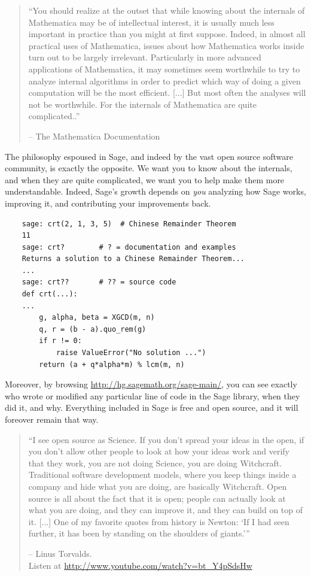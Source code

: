 \documentclass[multi]{cambridge7A}
\theoremstyle{plain}%
\theoremstyle{definition}
\begin{document}
\begin{quote}\small
  ``You should realize at the outset that while knowing about the
  internals of Mathematica may be of intellectual interest, it is
  usually much less important in practice than you might at first
  suppose.  Indeed, in almost all practical uses of Mathematica,
  issues about how Mathematica works inside turn out to be largely
  irrelevant.  Particularly in more advanced applications of
  Mathematica, it may sometimes seem worthwhile to try to analyze
  internal algorithms in order to predict which way of doing a given
  computation will be the most efficient. [...]  But most often the
  analyses will not be worthwhile. For the internals of Mathematica
  are quite complicated..''

-- The Mathematica Documentation
\end{quote}
The philosophy espoused in Sage, and indeed by the vast open source
software community, is exactly the opposite.  We want you to know
about the internals, and when they are quite complicated, we
want you to help make them more understandable.  Indeed, Sage's growth
depends on {\em you} analyzing how Sage works, improving it, and
contributing your improvements back.
\begin{lstlisting}
    sage: crt(2, 1, 3, 5)  # Chinese Remainder Theorem
    11 
    sage: crt?        # ? = documentation and examples
    Returns a solution to a Chinese Remainder Theorem...
    ...
    sage: crt??       # ?? = source code
    def crt(...):
    ...
        g, alpha, beta = XGCD(m, n)
        q, r = (b - a).quo_rem(g)
        if r != 0:
            raise ValueError("No solution ...")
        return (a + q*alpha*m) % lcm(m, n)
\end{lstlisting}
Moreover, by browsing \url{http://hg.sagemath.org/sage-main/}, you can
see exactly who wrote or modified any particular line of code in the
Sage library, when they did it, and why.  Everything included in Sage
is free and open source, and it will foreover remain
that way.

\begin{quote}\small
  ``I see open source as Science.  If you don't spread your ideas in
  the open, if you don't allow other people to look at how your ideas
  work and verify that they work, you are not doing Science, you are
  doing Witchcraft.  Traditional software development models, where
  you keep things inside a company and hide what you are doing, are
  basically Witchcraft.  Open source is all about the fact that it is
  open; people can actually look at what you are doing, and they can
  improve it, and they can build on top of it. [...] One of my
  favorite quotes from history is Newton: `If I had seen further, it
  has been by standing on the shoulders of giants.'{}''

  -- Linus Torvalds.\\\vbox{}\qquad Listen at
  \url{http://www.youtube.com/watch?v=bt_Y4pSdsHw}

\end{quote}
\end{document}
